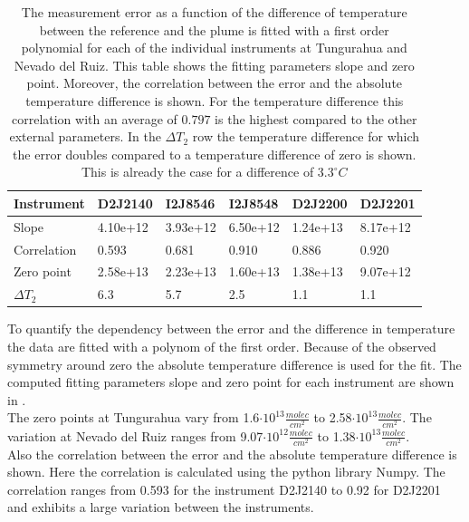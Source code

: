 \begin{table}[h]
	\centering
	\begin{tabular}{|p{2cm}|p{2cm}|p{2cm}|p{2cm}|p{2cm}|p{2cm}|}
		Instrument	&D2J2140&I2J8546& I2J8548&D2J2200&D2J2201\\
		\toprule
		Slope&4.10e+12 &3.93e+12 &6.50e+12 &1.24e+13&8.17e+12 \\
		\midrule
		Correlation
		& 
		0.593& 
		0.681& 
		0.910& 
		0.886& 
		0.920\\
		\midrule
		Zero point&2.58e+13&2.23e+13&1.60e+13& 1.38e+13& 9.07e+12\\
		\midrule
		$\Delta T_{2}$&6.3&5.7&2.5&1.1&1.1\\
		\bottomrule
	\end{tabular}
	\label{tab:tempe}
	\caption{The  measurement error as a function of the difference of temperature between the reference and the plume is fitted with a first order polynomial for each of the individual instruments at Tungurahua and Nevado del Ruiz. This table shows the fitting parameters slope and zero point. Moreover, the correlation between the  error and the absolute temperature difference is shown. For the temperature difference this correlation with an average of $0.797$ is the highest compared to the other external parameters. In the $\Delta T_{2}$ row the temperature difference for which the error doubles compared to a temperature difference of zero is shown. This is already the case for a difference of $3.3^\circ C$}
\end{table}
To quantify the dependency between the  error and the difference in temperature the data are fitted with a polynom of the first order. Because of the observed symmetry around zero the absolute temperature difference is used for the fit. The computed fitting parameters slope and zero point for each instrument are shown in . \\
The zero points at Tungurahua vary from 1.6$\cdot10^{13}\frac{molec}{cm^2}$ to 2.58$\cdot10^{13}\frac{molec}{cm^2}$. The variation at Nevado del Ruiz ranges from  9.07$\cdot10^{12}\frac{molec}{cm^2}$ to 1.38$\cdot10^{13}\frac{molec}{cm^2}$.\\
Also the correlation between the  error and the absolute temperature difference is shown. Here the correlation is calculated using the python library Numpy. The correlation ranges from 0.593 for the instrument D2J2140 to  0.92 for D2J2201 and exhibits a large variation between the instruments.\\
